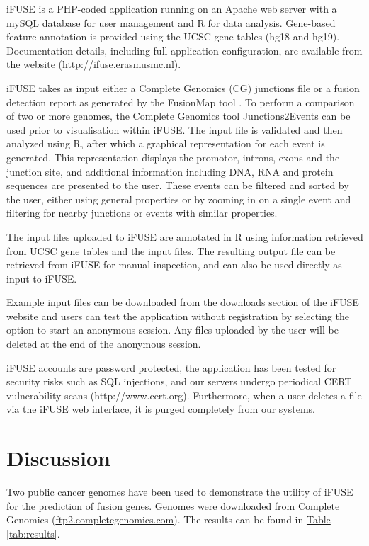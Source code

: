 iFUSE is a PHP-coded application running on an Apache web server with a mySQL database for user management and R for data analysis. Gene-based feature annotation is provided using the UCSC gene tables (hg18 and hg19). Documentation details, including full application configuration, are available from the website (\href{http://ifuse.erasmusmc.nl}{http://ifuse.erasmusmc.nl}).

iFUSE takes as input either a Complete Genomics (CG) junctions file or a fusion detection report as generated by the FusionMap tool \cite{ge2011fusionmap}.  To perform a comparison of two or more genomes, the Complete Genomics tool Junctions2Events can be used prior to visualisation within iFUSE.\color{black}
The input file is validated and then analyzed using R, after which a graphical representation for each event is generated. This representation displays the promotor, introns, exons and the junction site, and additional information including DNA, RNA and protein sequences are presented to the user. These events can be filtered and sorted by the user, either using general properties or by zooming in on a single event and filtering for nearby junctions or events with similar properties.

The input files uploaded to iFUSE are annotated in R using information retrieved from UCSC gene tables and the input files. The resulting output file can be retrieved from iFUSE for manual inspection, and can also be used directly as input to iFUSE.

Example input files can be downloaded from the downloads section of the iFUSE website and users can test the application without registration by selecting the option to start an anonymous session. Any files uploaded by the user will be deleted at the end of the anonymous session.

iFUSE accounts are password protected, the application has been tested for security risks such as SQL injections, and our servers undergo periodical CERT vulnerability scans (http://www.cert.org). Furthermore, when a user deletes a file via the iFUSE web interface, it is purged completely from our systems.

\section*{Discussion}


Two public cancer genomes have been used to demonstrate the utility of iFUSE for the prediction of fusion genes. Genomes were downloaded from Complete Genomics (\href{ftp2.completegenomics.com}{ftp2.completegenomics.com}). The results can be found in \hyperref[tab:results]{Table \ref*{tab:results}}.


